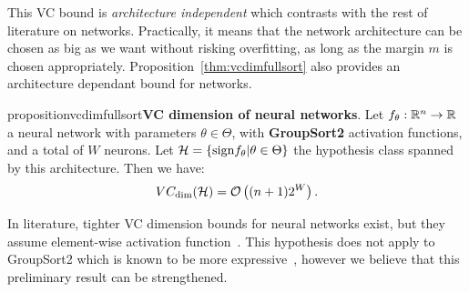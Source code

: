         This VC bound is \textit{architecture independent} which contrasts with the rest of literature on \LipInf networks. Practically, it means that the \LipCl network architecture can be chosen as big as we want without risking overfitting, as long as the margin $m$ is chosen appropriately. Proposition~\ref{thm:vcdimfullsort} also provides an architecture dependant bound for \LipCl networks. %
        \begin{restatable}{proposition}{vcdimfullsort}{\normalfont\textbf{VC dimension of \LipCl neural networks}.}\label{thm:vcdimfullsort}
            Let $f_{\theta}:\mathbb{R}^n\rightarrow\mathbb{R}$ a \LipCl neural network with parameters $\theta\in\Theta$, with \textbf{GroupSort2} activation functions, and a total of $W$ neurons. Let $\mathcal{H}=\{\text{sign}f_{\theta}|\theta\in\Theta\}$ the hypothesis class spanned by this architecture. Then we have:
            \begin{equation}
                VC_{\text{dim}}(\mathcal{H})=\mathcal{O}\left((n+1)2^W\right).
            \end{equation}
        \end{restatable}
            
        In literature, tighter VC dimension bounds for neural networks exist, but they assume element-wise activation function~\cite{bartlett2019nearly}. This hypothesis does not apply to GroupSort2 which is known to be more expressive~\cite{tanielian2021approximating}, however we believe that this preliminary result can be strengthened.  

    
        
      
